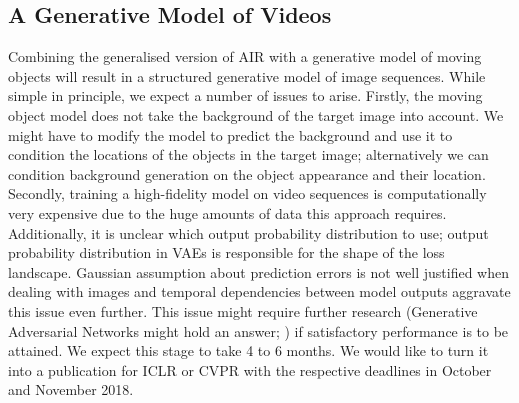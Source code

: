     
    \subsection{A Generative Model of Videos}
        Combining the generalised version of AIR with a generative model of moving objects will result in a structured generative model of image sequences. While simple in principle, we expect a number of issues to arise. Firstly, the moving object model does not take the background of the target image into account. We might have to modify the model to predict the background and use it to condition the locations of the objects in the target image; alternatively we can condition background generation on the object appearance and their location. 
        Secondly, training a high-fidelity model on video sequences is computationally very expensive due to the huge amounts of data this approach requires.
        Additionally, it is unclear which output probability distribution to use; output probability distribution in VAEs is responsible for the shape of the loss landscape. Gaussian assumption about prediction errors is not well justified when dealing with images and temporal dependencies between model outputs aggravate this issue even further. This issue might require further research (Generative Adversarial Networks might hold an answer; \cite{Wenzhe2016}) if satisfactory performance is to be attained. We expect this stage to take 4 to 6 months.
        We would like to turn it into a publication for ICLR or CVPR with the respective deadlines in October and November 2018.
    
